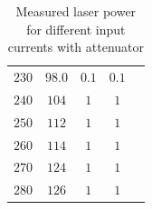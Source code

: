 \documentclass{protokoll_en}
\begin{document}
\begin{appendix}
\begin{table}[H]
{\begin{tabular}{lcccc}
$230$ & $98.0$ & $0.1$ & $0.1$\\
$240$ & $104$ & $1$ & $1$\\
$250$ & $112$ & $1$ & $1$\\
$260$ & $114$ & $1$ & $1$\\
$270$ & $124$ & $1$ & $1$\\
$280$ & $126$ & $1$ & $1$\\
    \bottomrule
  \end{tabular}
}
\caption{Measured laser power for different input currents with attenuator}
  \label{tab:ana_laserpower_att}
\end{table}
\begin{table}[H]
  \centering
{}
\caption{Measured laser power for different input currents without attenuator}
  \label{tab:ana_laserpower_woatt}
\end{table}


\end{appendix}
\end{document}
